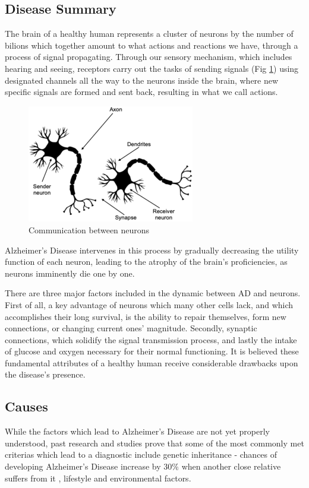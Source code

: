 \documentclass[a4paper, 12pt]{article}
\begin{document}
\subsection{Disease Summary}

The brain of a healthy human represents a cluster of neurons by the number of bilions which together amount to
what actions and reactions we have, through a process of signal propagating.
Through our sensory mechanism, which includes hearing and seeing, receptors carry out the tasks of sending signals
(Fig \ref{fig:neuron-communication}) using designated channels all the way to the neurons inside the brain, where new
specific signals are formed and sent back, resulting in what we call actions. \cite{Sivadas2020HowDM}

\begin{figure}[htbp]
    \centering
    \includegraphics[width=0.65\textwidth]{figs/neuron-communication.jpg}
    \caption{Communication between neurons}
    \label{fig:neuron-communication}
\end{figure}

Alzheimer's Disease intervenes in this process by gradually decreasing the utility function of each neuron, leading to
the atrophy of the brain's proficiencies, as neurons imminently die one by one.

There are three major factors included in the dynamic between AD and neurons.
First of all, a key advantage of neurons which many other cells lack, and which accomplishes
their long survival, is the ability to repair themselves, form new connections, or changing current ones' magnitude.
Secondly, synaptic connections, which solidify the signal transmission process, and lastly the intake of glucose and
oxygen necessary for their normal functioning.
It is believed these fundamental attributes of a healthy human receive considerable drawbacks upon the disease's presence.
\cite{NIH1}

\subsection{Causes} %
While the factors which lead to Alzheimer's Disease are not yet properly understood, past research and studies prove that some
of the most commonly met criterias which lead to a diagnostic include genetic inheritance - chances of developing Alzheimer's
Disease increase by 30\% when another close relative suffers from it \cite{HMS20192801}, lifestyle and environmental factors.
\end{document}
